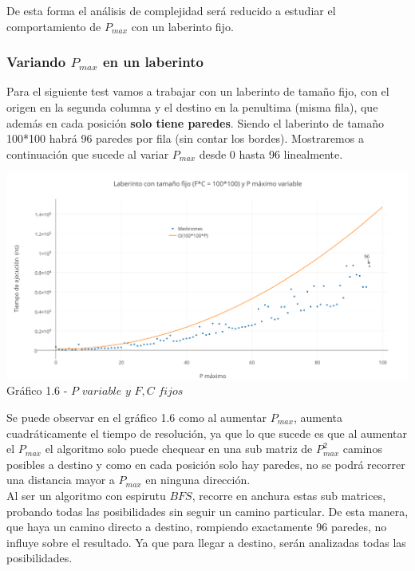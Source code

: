 De esta forma el análisis de complejidad será reducido a estudiar el comportamiento de $P_{max}$ con un laberinto fijo.

\subsubsection*{Variando $P_{max}$ en un laberinto}

Para el siguiente test vamos a trabajar con un laberinto de tamaño fijo, con el origen en la segunda columna y el destino en la penultima (misma fila), que además en cada posición \textbf{solo tiene paredes}. Siendo el laberinto de tamaño 100*100 habrá 96 paredes por fila (sin contar los bordes).
Mostraremos a continuaci\'on que sucede al variar $P_{max}$ desde 0 hasta 96 linealmente.\\

\vspace*{0.3cm} \vspace*{0.3cm}
  \begin{center}
\includegraphics[scale=0.5]{./EJ1/pVariableBfs.png}
{Gr\'afico 1.6 - $P$ $variable$ $y$ $F,C$ $fijos$}
  \end{center}
  \vspace*{0.3cm}

Se puede observar en el gr\'afico 1.6 como al aumentar $P_{max}$, aumenta cuadráticamente el tiempo de resoluci\'on, ya que lo que sucede es que al aumentar el $P_{max}$ el algoritmo solo puede chequear en una sub matriz de $P_{max}^2$ caminos posibles a destino y como en cada posición solo hay paredes, no se podrá recorrer una distancia mayor a $P_{max}$ en ninguna dirección.\\
Al ser un algoritmo con espirutu $BFS$, recorre en anchura estas sub matrices, probando todas las posibilidades sin seguir un camino particular. De esta manera, que haya un camino directo a destino, rompiendo exactamente 96 paredes, no influye sobre el resultado. Ya que para llegar a destino, serán analizadas todas las posibilidades. 

